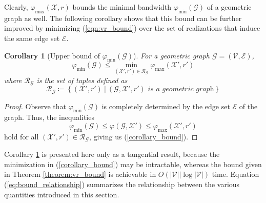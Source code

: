 \documentclass[twocolumn]{article}
\theoremstyle{plain}
\newtheorem{corollary}{Corollary}[theorem]
\theoremstyle{definition}
\theoremstyle{definition}
\theoremstyle{remark}
\begin{document}
Clearly, $\varphi _{\textrm{max}}(\mathcal X, r)$ bounds the minimal bandwidth $\varphi _{\textrm{min}} (\mathcal G)$ of a geometric graph as well. The following corollary shows that this bound can be further improved by minimizing (\ref{eqn:vr_bound}) over the set of realizations that induce the same edge set $\mathcal E$.
\begin{corollary}[Upper bound of $\varphi_{\textrm{min}}(\mathcal G)$]
\label{corollary:sig_min}
For a geometric graph $\mathcal G=(\mathcal V, \mathcal E)$,
\begin{equation}
\varphi _{\textrm{min}} (\mathcal G) \leq \min_{(\mathcal X', r') \in \mathcal{R}_\mathcal{G}} 
\varphi _{\textrm{max}}(\mathcal X', r')
 \label{corollary_bound}
\end{equation}
where $\mathcal{R}_\mathcal{G}$ is the set of tuples defined as
\begin{equation}
 \mathcal{R}_\mathcal{G} \coloneqq  \left\lbrace 
 (\mathcal X', r')\ \big\vert \ (\mathcal G, \mathcal X', r') \textit{ is a geometric graph} 
 \right\rbrace
 \label{eqn:R_g_defn}
\end{equation}
\end{corollary}
\begin{proof}
Observe that $\varphi _{\textrm{min}}(\mathcal G)$ is completely determined by the edge set $\mathcal E$ of the graph. Thus, the inequalities
\begin{equation}
\varphi_{\textrm{min}}(\mathcal G)  \leq  \varphi  (\mathcal G, \mathcal X')\leq \varphi _{\textrm{max}}(\mathcal X', r')
\label{eq:bound_relationship}
\end{equation}
hold for all $(\mathcal X', r') \in \mathcal R_{\mathcal G}$, giving us (\ref{corollary_bound}).
\end{proof}
Corollary \ref{corollary:sig_min} is presented here only as a tangential result, because the minimization in (\ref{corollary_bound}) may be intractable, whereas the bound given in Theorem \ref{theorem:vr_bound} is achievable in $O(|\mathcal V||\log |\mathcal V|)$ time.
Equation (\ref{eq:bound_relationship}) summarizes the relationship between the various quantities introduced in this section.
\end{document}
